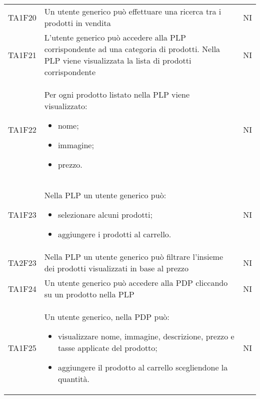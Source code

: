 {\begin{longtable}{C{3cm} C{10.2cm} C{1.5cm}}
TA1F20 & Un utente generico può effettuare una ricerca tra i prodotti in vendita & NI\\

TA1F21 & L'utente generico può accedere alla PLP corrispondente ad una categoria di prodotti. Nella PLP viene visualizzata la lista di prodotti corrispondente & NI\\

TA1F22 & Per ogni prodotto listato nella PLP viene visualizzato:
\begin{itemize}
	\item nome;
	\item immagine;
	\item prezzo.
\end{itemize} & NI\\

TA1F23 & Nella PLP un utente generico può:
\begin{itemize}
	\item selezionare alcuni prodotti;
	\item aggiungere i prodotti al carrello.
\end{itemize} & NI\\

TA2F23 & Nella PLP un utente generico può filtrare l'insieme dei prodotti visualizzati in base al prezzo & NI\\

TA1F24 & Un utente generico può accedere alla PDP cliccando su un prodotto nella PLP & NI\\

TA1F25 & Un utente generico, nella PDP può:
\begin{itemize}
	\item visualizzare nome, immagine, descrizione, prezzo e tasse applicate del prodotto;
	\item aggiungere il prodotto al carrello scegliendone la quantità.
\end{itemize} & NI\\



\end{longtable}


}